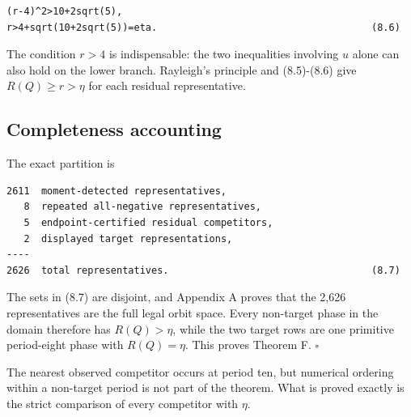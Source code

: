 \begin{lstlisting}[language={}]
(r-4)^2>10+2sqrt(5),
r>4+sqrt(10+2sqrt(5))=eta.                                     (8.6)
\end{lstlisting}

The condition \(r>4\) is indispensable: the two inequalities involving \(u\)
alone can also hold on the lower branch. Rayleigh's principle and (8.5)-(8.6)
give \(R(Q)\ge r>\eta\) for each residual representative.

\subsection{Completeness accounting}

The exact partition is

\begin{lstlisting}[language={}]
2611  moment-detected representatives,
   8  repeated all-negative representatives,
   5  endpoint-certified residual competitors,
   2  displayed target representations,
----
2626  total representatives.                                   (8.7)
\end{lstlisting}

The sets in (8.7) are disjoint, and Appendix A proves that the 2,626
representatives are the full legal orbit space. Every non-target phase in the
domain therefore has \(R(Q)>\eta\), while the two target rows are one primitive
period-eight phase with \(R(Q)=\eta\). This proves Theorem F. \(\square\)

The nearest observed competitor occurs at period ten, but numerical ordering
within a non-target period is not part of the theorem. What is proved exactly
is the strict comparison of every competitor with \(\eta\).
